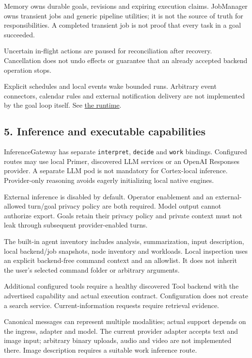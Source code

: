 \documentclass[
  10pt,
]{article}
\begin{document}
Memory owns durable goals, revisions and expiring execution claims.
JobManager owns transient jobs and generic pipeline utilities; it is not
the source of truth for responsibilities. A completed transient job is
not proof that every task in a goal succeeded.

Uncertain in-flight actions are paused for reconciliation after
recovery. Cancellation does not undo effects or guarantee that an
already accepted backend operation stops.

Explicit schedules and local events wake bounded runs. Arbitrary event
connectors, calendar rules and external notification delivery are not
implemented by the goal loop itself. See
\href{https://github.com/ILGSupreme/Orin/blob/main/docs/cortex-agent.md}{the
runtime}.

\hypertarget{inference-and-executable-capabilities}{%
\subsection{5. Inference and executable
capabilities}\label{inference-and-executable-capabilities}}

InferenceGateway has separate \texttt{interpret}, \texttt{decide} and
\texttt{work} bindings. Configured routes may use local Primer,
discovered LLM services or an OpenAI Responses provider. A separate LLM
pod is not mandatory for Cortex-local inference. Provider-only reasoning
avoids eagerly initializing local native engines.

External inference is disabled by default. Operator enablement and an
external-allowed turn/goal privacy policy are both required. Model
output cannot authorize export. Goals retain their privacy policy and
private context must not leak through subsequent provider-enabled turns.

The built-in agent inventory includes analysis, summarization, input
description, local backend/job snapshots, node inventory and workloads.
Local inspection uses an explicit backend-free command context and an
allowlist. It does not inherit the user's selected command folder or
arbitrary arguments.

Additional configured tools require a healthy discovered Tool backend
with the advertised capability and actual execution contract.
Configuration does not create a search service. Current-information
requests require retrieval evidence.

Canonical messages can represent multiple modalities; actual support
depends on the ingress, adapter and model. The current provider adapter
accepts text and image input; arbitrary binary uploads, audio and video
are not implemented there. Image description requires a suitable work
inference route.
\end{document}
